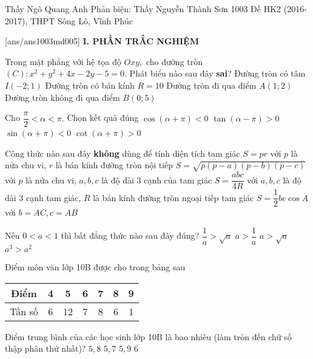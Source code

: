 \begin{name}
{Thầy Ngô Quang Anh \newline
Phản biện: Thầy Nguyễn Thành Sơn}
{1003 Đề HK2 (2016-2017), THPT Sông Lô, Vĩnh Phúc}%
	\end{name}
	\setcounter{ex}{0}\setcounter{bt}{0}
	[ans/ans1003md005]
\noindent\textbf{I. PHẦN TRẮC NGHIỆM}
\begin{ex}%
	Trong mặt phẳng với hệ tọa độ $Oxy,$ cho đường tròn $(C):x^2+y^2+4x-2y-5=0.$  Phát biểu nào sau đây \textbf{sai}?
	\choice
	{Đường tròn có tâm $I\left(-2;1\right)$}
	{\True Đường tròn có bán kính $R=10$}
	{Đường tròn đi qua điểm $A\left(1;2\right)$}
	{Đường tròn không đi qua điểm $B\left(0;5\right)$}
\end{ex}
\begin{ex}%
	Cho $\dfrac{\pi}{2}<\alpha <\pi.$ Chọn kết quả đúng
	\choice
	{$\cos \left(\alpha+\pi \right)<0$}
	{$\tan \left(\alpha-\pi \right)>0$}
	{\True$\sin \left(\alpha+\pi \right)<0$}
	{$\cot \left(\alpha+\pi \right)>0$}
\end{ex}
\begin{ex}%
	Công thức nào sau đây \textbf{không} dùng để tính diện tích tam giác 
	\choice
	{$S=pr$ với $p$ là nửa chu vi, $r$ là bán kính đường tròn nội tiếp}
	{$S=\sqrt{p(p-a)(p-b)(p-c)}$ với $p$ là nửa chu vi, $a,b,c$ là độ dài $3$ cạnh của tam giác}
	{$S=\dfrac{abc}{4R}$ với $a,b,c$ là độ dài $3$ cạnh tam giác, $R$ là bán kính đường tròn ngoại tiếp tam giác}
	{\True $S=\dfrac{1}{2}bc\cos A$ với $b=AC,c=AB$}
\end{ex}
\begin{ex}%
	Nếu $0<a<1$ thì bất đẳng thức nào sau đây đúng?
	\choice
	{\True $\dfrac{1}{a}>\sqrt{a}$}
	{$a>\dfrac{1}{a}$}
	{$a>\sqrt{a}$}
	{$a^3>a^2$}
\end{ex}
\begin{ex}%
	Điểm môn văn lớp 10B được cho trong bảng sau
	\begin{center}
		\begin{tabular}{ |c|c|c|c|c|c|c| }
			\hline
			Điểm & 4 & 5 & 6 & 7 & 8 & 9 \\
			\hline
			Tần số & 6 & 12 & 7 & 8 & 6 & 1  \\  
			\hline   
		\end{tabular}
	\end{center}
 Điểm trung bình của các học sinh lớp 10B là bao nhiêu (làm tròn đến chữ số thập phân thứ nhất)?
	\choice
	{$5,8$}
	{$5,7$}
	{$5,9$}
	{\True $6$}
\end{ex}
